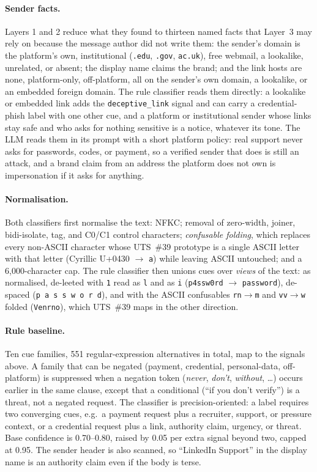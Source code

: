\documentclass[10pt,twocolumn]{article}
\newcommand{\code}[1]{\texttt{#1}}
\newcommand{\cp}[1]{\mbox{U+#1}}
\begin{document}
\paragraph{Sender facts.} Layers 1 and 2 reduce what they found to thirteen named facts that Layer~3 may rely on because the message author did not write them: the sender's domain is the platform's own, institutional (\code{.edu}, \code{.gov}, \code{ac.uk}), free webmail, a lookalike, unrelated, or absent; the display name claims the brand; and the link hosts are none, platform-only, off-platform, all on the sender's own domain, a lookalike, or an embedded foreign domain. The rule classifier reads them directly: a lookalike or embedded link adds the \code{deceptive\_link} signal and can carry a credential-phish label with one other cue, and a platform or institutional sender whose links stay safe and who asks for nothing sensitive is a notice, whatever its tone. The LLM reads them in its prompt with a short platform policy: real support never asks for passwords, codes, or payment, so a verified sender that does is still an attack, and a brand claim from an address the platform does not own is impersonation if it asks for anything.

\paragraph{Normalisation.} Both classifiers first normalise the text: NFKC; removal of zero-width, joiner, bidi-isolate, tag, and C0/C1 control characters; \emph{confusable folding}, which replaces every non-ASCII character whose UTS~\#39 prototype is a single ASCII letter with that letter (Cyrillic \cp{0430} $\to$ \code{a}) while leaving ASCII untouched; and a 6{,}000-character cap. The rule classifier then unions cues over \emph{views} of the text: as normalised, de-leeted with \code{1} read as \code{l} and as \code{i} (\code{p4ssw0rd} $\to$ \code{password}), de-spaced (\code{p a s s w o r d}), and with the ASCII confusables \code{rn}$\to$\code{m} and \code{vv}$\to$\code{w} folded (\code{Venrno}), which UTS~\#39 maps in the other direction.

\paragraph{Rule baseline.} Ten cue families, 551 regular-expression alternatives in total, map to the signals above. A family that can be negated (payment, credential, personal-data, off-platform) is suppressed when a negation token (\emph{never}, \emph{don't}, \emph{without}, \ldots) occurs earlier in the same clause, except that a conditional (``if you don't verify'') is a threat, not a negated request. The classifier is precision-oriented: a label requires two converging cues, e.g.\ a payment request plus a recruiter, support, or pressure context, or a credential request plus a link, authority claim, urgency, or threat. Base confidence is 0.70--0.80, raised by 0.05 per extra signal beyond two, capped at 0.95. The sender header is also scanned, so ``LinkedIn Support'' in the display name is an authority claim even if the body is terse.
\end{document}
